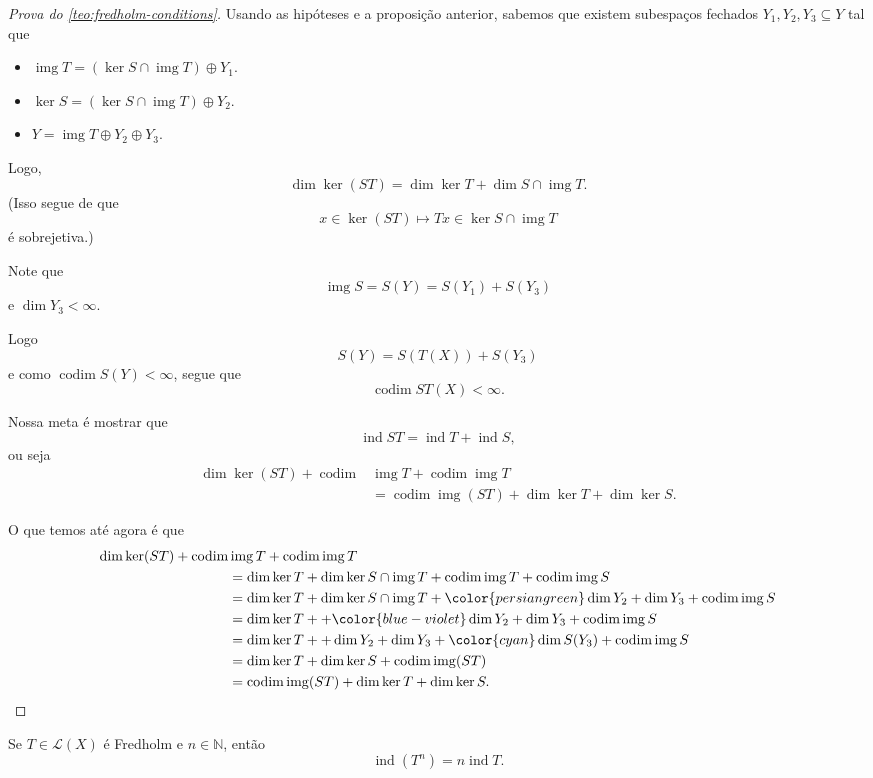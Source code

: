 \documentclass[portuguese]{article}
\theoremstyle{definition}
\newcommand{\N}{\mathbb{N}}
\DeclareMathOperator{\img}{img}
\begin{document}
\begin{proof}[Prova do \cref{teo:fredholm-conditions}]
	Usando as hipóteses e a proposição anterior, sabemos que existem subespaços fechados $Y_1,Y_2,Y_3\subseteq Y$ tal que
	\begin{itemize}
		\item $\img T=(\ker S\cap \img T)\oplus Y_1$.
		\item $\ker S=(\ker S\cap \img T)\oplus Y_2$.
		\item $Y=\img T\oplus Y_2\oplus Y_3$.
	\end{itemize}
	Logo,
	\[\dim \ker (ST)=\dim\ker T+\dim S\cap \img T.\]
	(Isso segue de que
	\[x\in \ker (ST)\mapsto Tx\in\ker S\cap \img T\]
	é sobrejetiva.)
	
	Note que
	\[\img S=S(Y)=S(Y_1)+S(Y_3)\]
	e $\dim Y_3<\infty$.
	
	Logo
	\[S(Y)=S(T(X))+S(Y_3)\]
	e como $\operatorname{codim}S(Y)<\infty$, segue que
	\[\operatorname{codim}ST(X)<\infty.\]
	
	\begin{obs}
		Nossa meta é mostrar que
		\[\operatorname{ind}ST=\operatorname{ind}T+\operatorname{ind}S,\]
		ou seja
		\begin{align*}
			\dim\ker (ST)+\operatorname{codim}&\img T+\operatorname{codim}\img T\\
			&=\operatorname{codim}\img (ST)+\dim\ker T+\dim\ker S.
		\end{align*}
	\end{obs}
	O que temos até agora é que
	\begin{align*}
		\dim\ker (ST)+\operatorname{codim}&\img T+\operatorname{codim}\img T\\
		&=\dim\ker T+\dim \ker S\cap\img T+\operatorname{codim}\img T+\operatorname{codim}\img S\\
		&=\dim\ker T+\dim \ker S\cap\img T+{\color{persiangreen}\dim Y_2+\dim Y_3}+\operatorname{codim}\img S\\
		&=\dim\ker T++{\color{blue-violet}\dim Y_2+\dim Y_3}+\operatorname{codim}\img S\\
		&=\dim\ker T++\dim Y_2+\dim Y_3+{\color{cyan}\dim S(Y_3)+\operatorname{codim}\img S}\\
		&=\dim\ker T+\dim \ker S+\operatorname{codim}\img (ST)\\
		&=\operatorname{codim}\img (ST)+\dim\ker T+\dim\ker S.
	\end{align*}
\end{proof}
\begin{coro}
	Se $T\in\mathcal{L}(X)$ é Fredholm e $n\in\N$, então
	\[\operatorname{ind}(T^n)=n\operatorname{ind}T.\]
\end{coro}
\end{document}
